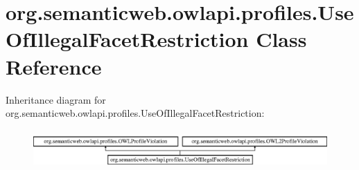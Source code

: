 \hypertarget{classorg_1_1semanticweb_1_1owlapi_1_1profiles_1_1_use_of_illegal_facet_restriction}{\section{org.\-semanticweb.\-owlapi.\-profiles.\-Use\-Of\-Illegal\-Facet\-Restriction Class Reference}
\label{classorg_1_1semanticweb_1_1owlapi_1_1profiles_1_1_use_of_illegal_facet_restriction}
}
Inheritance diagram for org.\-semanticweb.\-owlapi.\-profiles.\-Use\-Of\-Illegal\-Facet\-Restriction\-:\begin{figure}[H]
\begin{center}
\leavevmode
\includegraphics[height=1.538461cm]{classorg_1_1semanticweb_1_1owlapi_1_1profiles_1_1_use_of_illegal_facet_restriction}
\end{center}
\end{figure}
